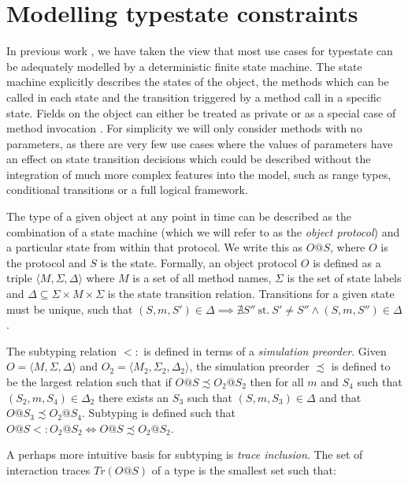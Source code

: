 \documentclass[preprint]{sigplanconf}
\newcommand{\Tr}{\mathit{Tr}}
\begin{document}
\section{Modelling typestate constraints}
\label{sec:tsmodel}

In previous work \cite{McGinniss2011}, we have taken the view that most use 
cases for typestate can be adequately modelled by a deterministic
finite state machine. The state machine explicitly describes the
states of the object, the methods which can be called in each state and
the transition triggered by a method call in a specific state.
Fields on the object can either be treated as private or as a special case
of method invocation \cite{Abadi1996}. For simplicity
we will only consider methods with no parameters, as there are very few
use cases where the values of parameters have an effect on state transition 
decisions which could be described without the integration of much more
complex features into the model, such as range types, conditional transitions
or a full logical framework.

The type of a given object at any point in time can be described as the
combination of a state machine (which we will refer to as the 
{\it object protocol}) and a particular state from within that protocol.
We write this as $O@S$, where $O$ is the protocol and $S$ is the state.
Formally, an object protocol $O$ is defined as a triple
$\langle M, \Sigma, \Delta \rangle$ where $M$ is a set of all
method names, $\Sigma$ is the set of state labels and
$\Delta \subseteq \Sigma \times M \times \Sigma$ is the state
transition relation. Transitions for a given state must be unique, such that 
$(S, m, S') \in \Delta \implies \nexists S'' \:\mathrm{st.}\: S' \neq S'' 
\wedge (S, m, S'') \in \Delta$.

The subtyping relation $<:$ is defined in terms of a
{\it simulation preorder}. Given $O = \langle M, \Sigma, \Delta \rangle$ and
$O_2 = \langle M_2, \Sigma_2, \Delta_2 \rangle$, the simulation preorder
$\precsim$
is defined to be the largest relation such that if $O@S \precsim O_2@S_2$ then for all
$m$ and $S_4$ such that $(S_2, m, S_4) \in \Delta_2$ there exists an $S_3$ such that
$(S, m, S_3) \in \Delta$ and that $O@S_3 \precsim O_2@S_4$.
Subtyping is defined such that $O@S <: O_2@S_2 \iff O@S \precsim O_2@S_2$.

A perhaps more intuitive basis for subtyping is {\it trace inclusion}. The set 
of interaction traces $\Tr(O@S)$ of a type is the smallest set such that:
\end{document}
